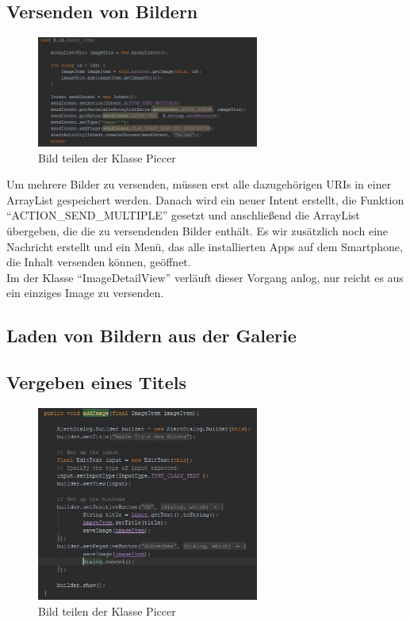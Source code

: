 \subsection{Versenden von Bildern}
\begin{figure}[H]
\label{Share_Item}
\centering
\includegraphics[width=0.65\textwidth]{images/share_item}
\caption{Bild teilen der Klasse Piccer}
\end{figure}
Um mehrere Bilder zu versenden, müssen erst alle dazugehörigen URIs in einer ArrayList gespeichert werden. Danach wird ein neuer Intent erstellt, die Funktion \enquote{ACTION\_SEND\_MULTIPLE} gesetzt und anschließend die ArrayList übergeben, die die zu versendenden Bilder enthält. Es wir zusätzlich noch eine Nachricht erstellt und ein Menü, das alle installierten Apps auf dem Smartphone, die Inhalt versenden können, geöffnet.\\
Im der Klasse \enquote{ImageDetailView} verläuft dieser Vorgang anlog, nur reicht es aus  ein einziges Image zu versenden. 

\subsection{Laden von Bildern aus der Galerie}
\subsection{Vergeben eines Titels}
\begin{figure}[H]
\label{Share_Item}
\centering
\includegraphics[width=0.65\textwidth]{images/Dialog}
\caption{Bild teilen der Klasse Piccer}
\end{figure}
